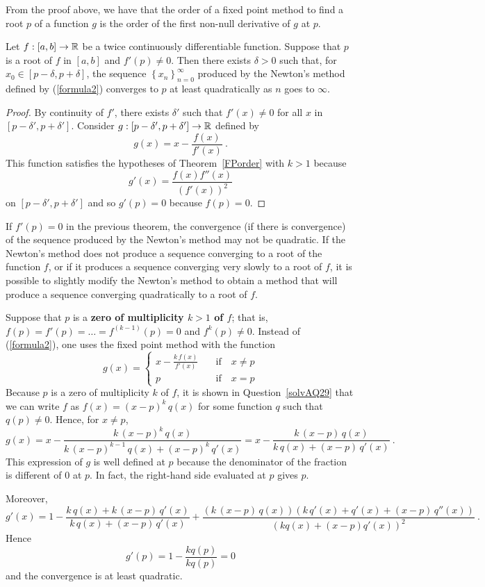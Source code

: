 From the proof above, we have that the order of a fixed point method
to find a root $p$ of a function $g$ is the order of the first
non-null derivative of $g$ at $p$.

\begin{theorem}
Let $f:[a,b] \rightarrow \mathbb{R}$ be a twice continuously differentiable
function.  Suppose that $p$ is a root of $f$ in $[a,b]$ and
$f'(p) \neq 0$.  Then there exists $\delta > 0$ such that, for
$x_0 \in [p-\delta, p + \delta]$, the sequence
$\displaystyle \left\{x_n\right\}_{n=0}^\infty$ produced by the
Newton's method defined by (\ref{formula2}) converges to $p$ at least
quadratically as $n$ goes to $\infty$.
\label{newton_order}
\end{theorem}

\begin{proof}
By continuity of $f'$, there exists $\delta'$ such that $f'(x) \neq 0$
for all $x$ in $[p-\delta',p+\delta']$.  Consider
$g:[p-\delta',p+\delta'] \rightarrow \mathbb{R}$ defined by
\[
g(x) = x - \frac{f(x)}{f'(x)} \ .
\]
This function satisfies the hypotheses of Theorem~\ref{FPorder} with
$k > 1$ because
\[
g'(x) = \frac{f(x)f''(x)}{(f'(x))^2}
\]
on $[p-\delta',p+\delta']$ and so $g'(p) = 0$ because $f(p) = 0$.
\end{proof}

\begin{rmk}
If $f'(p) = 0$ in the previous theorem, the convergence (if there is
convergence) of the sequence produced by the Newton's method may
not be quadratic.  If the Newton's method does not produce a
sequence converging to a root of the function $f$, or if it
produces a sequence converging very slowly to a root of $f$, it is
possible to slightly modify the Newton's method to obtain a method
that will produce a sequence converging quadratically to a root of
$f$.

Suppose that $p$ is a {\bfseries zero of multiplicity $k> 1$ of
$f$};
that is, $f(p) = f'(p) = \ldots = f^{(k-1)}(p) = 0$ and $f^k(p) \neq 0$. 
Instead of (\ref{formula2}), one uses the fixed point method
with the function
\[
g(x) = \begin{cases}
\displaystyle x - \frac{k\,f(x)}{f'(x)} & \quad \text{if} \quad x \neq p \\
  p & \quad \text{if} \quad x = p
\end{cases}
\]
Because $p$ is a zero of multiplicity $k$ of $f$, it is shown in
Question~\ref{solvAQ29} that we can write $f$ as
$f(x) = (x-p)^k\,q(x)$ for some function $q$ such that
$q(p) \neq 0$. Hence, for $x \neq p$,
\[
g(x) = x - \frac{k\,(x-p)^k\,q(x)}
{k\,(x-p)^{k-1}\,q(x)+(x-p)^k\,q'(x)}
= x - \frac{k\,(x-p)\,q(x)}{k\,q(x) + (x-p)\,q'(x)} \ .
\]
This expression of $g$ is well defined at $p$ because the denominator
of the fraction is different of $0$ at $p$.  In fact, the right-hand
side evaluated at $p$ gives $p$.

Moreover,
\[
g'(x) = 1 -
\frac{k\,q(x) + k\,(x-p)\,q'(x)}{k\,q(x) + (x-p)\,q'(x)}
+ \frac{\left(k\,(x-p)\,q(x)\right)
\left(k\,q'(x) + q'(x) + (x-p)\,q''(x)\right)}
{\left(kq(x) + (x-p)q'(x) \right)^2} \ .
\]
Hence
\[
g'(p) = 1 - \frac{kq(p)}{kq(p)} = 0
\]
and the convergence is at least quadratic.
\label{multiplicity}
\end{rmk}


